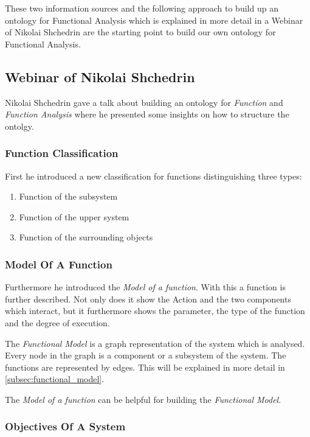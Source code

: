 \documentclass[11pt,a4paper]{article}
\begin{document}
These two information sources and the following approach to build up an
ontology for Functional Analysis which is explained in more detail in a
Webinar of Nikolai Shchedrin are the starting point to build our own ontology
for Functional Analysis.

\subsection{Webinar of Nikolai Shchedrin}

Nikolai Shchedrin gave a talk about building an ontology for \textit{Function}
and \textit{Function Analysis} \cite{WebinarFunctionAnalysis} where he
presented some insights on how to structure the ontolgy.

\subsubsection{Function Classification}
\label{subsubsec:function_classification}

First he introduced a new classification for functions distinguishing three
types:
\begin{enumerate}
\item Function of the subsystem
\item Function of the upper system
\item Function of the surrounding objects
\end{enumerate}

\subsubsection{Model Of A Function}

Furthermore he introduced the \textit{Model of a function}.  With this a
function is further described.  Not only does it show the Action and the two
components which interact, but it furthermore shows the parameter, the type of
the function and the degree of execution.

The \textit{Functional Model} is a graph representation of the system which is
analysed.  Every node in the graph is a component or a subsystem of the
system.  The functions are represented by edges.  This will be explained in
more detail in \ref{subsec:functional_model}.

The \textit{Model of a function} can be helpful for building the
\textit{Functional Model}.

\subsubsection{Objectives Of A System}
\label{subsubsec:objectives_system}
\end{document}
